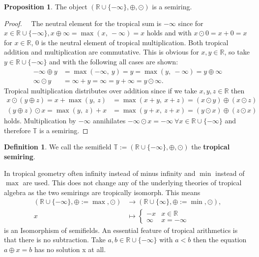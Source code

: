 \documentclass{article}
\theoremstyle{definition}
\newtheorem{definition}[theorem]{Definition}
\newtheorem{proposition}[theorem]{Proposition}
\begin{document}
\begin{proposition}
The object $( \mathbb{R} \cup \{- \infty \} , \oplus , \odot )$ is a semiring. \cite[p.~10]{maclagan2015introduction}
\end{proposition}
\begin{proof}
~\
The neutral element for the tropical sum is $- \infty$ since for $x \in \mathbb{R} \cup \{- \infty \}, x \oplus \infty = \max(x,\ - \infty) = x$ holds and with $x \odot 0 = x + 0 = x$ for $x \in \mathbb{R}$, $0$ is the neutral element of tropical multiplication. Both tropical addition and multiplication are commutative. This is obvious for $x,y \in \mathbb{R}$, so take $y \in \mathbb{R} \cup \{- \infty \}$ and with the following all cases are shown:
\begin{align*}
- \infty \oplus y &= \max (- \infty ,\ y) =   y = \max ( y,\ - \infty ) = y \oplus \infty \\
\infty \odot y &= \infty +y = \infty = y+ \infty = y \odot \infty.
\end{align*}
Tropical multiplication distributes over addition since if we take $x, y, z \in \mathbb{R}$ then
\begin{align*}
x \odot (y \oplus z) = x + \max (y,\ z) &=   \max (x + y,\ x + z) = (x \odot y) \oplus (x \odot z) \\
(y \oplus z) \odot x = \max (y,\ z) + x &=   \max (y + x,\ z + x) = (y \odot x) \oplus (z \odot x)
\end{align*}
holds. Multiplication by $- \infty$ annihilates $- \infty \odot x = - \infty \: \forall x \in  \mathbb{R} \cup \{- \infty \}$ and therefore $\mathbb{T}$ is a semiring.
\end{proof}

\begin{definition}
We call the semifield $\mathbb{T} := ( \mathbb{R} \cup \{- \infty \} , \oplus , \odot )$ the \textbf{tropical semiring}.
\end{definition}

In tropical geometry often infinity instead of minus infinity and $\min$ instead of $\max$ are used. This does not change any of the underlying theories of tropical algebra as the two semirings are tropically isomorph. This means
\begin{align*}
( \mathbb{R} \cup \{- \infty \} , \oplus := \max, \odot ) &\to ( \mathbb{R} \cup \{ \infty \} , \oplus := \min , \odot ), \\
x &\mapsto \begin{cases} -x & x \in \mathbb{R}\\
\infty & x = - \infty
\end{cases}
\end{align*}
is an Isomorphism of semifields. An essential feature of tropical arithmetics is that there is no subtraction. Take $a, b \in \mathbb{R} \cup \{- \infty \}$ with $a < b$ then the equation $a \oplus x=b$ has no solution x at all. \cite[p.~11]{maclagan2015introduction} \\ \\
\end{document}
